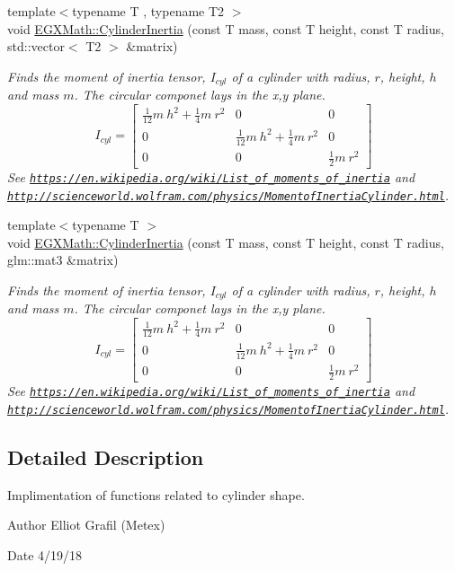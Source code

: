 \begin{DoxyCompactItemize}
{\footnotesize template$<$typename T , typename T2 $>$ }\\void \mbox{\hyperlink{group___e_g_x_math-_geometry-3_d-_cylinder_gac46dd57839cb2157d1bb6dd430d781ec}{E\+G\+X\+Math\+::\+Cylinder\+Inertia}} (const T mass, const T height, const T radius, std\+::vector$<$ T2 $>$ \&matrix)
\begin{DoxyCompactList}\small\item\em Finds the moment of inertia tensor, $I_{cyl}$ of a cylinder with radius, $r$, height, $h$ and mass $m$. The circular componet lays in the x,y plane. \[ I_{cyl}=\begin{bmatrix} \frac{1}{12}m\ h^2 + \frac{1}{4}m\ r^2 & 0 & 0\\ 0 & \frac{1}{12}m\ h^2 + \frac{1}{4}m\ r^2 & 0\\ 0 & 0 & \frac{1}{2}m\ r^2 \end{bmatrix} \] See \href{https://en.wikipedia.org/wiki/List_of_moments_of_inertia}{\tt https\+://en.\+wikipedia.\+org/wiki/\+List\+\_\+of\+\_\+moments\+\_\+of\+\_\+inertia} and \href{http://scienceworld.wolfram.com/physics/MomentofInertiaCylinder.html}{\tt http\+://scienceworld.\+wolfram.\+com/physics/\+Momentof\+Inertia\+Cylinder.\+html}. \end{DoxyCompactList}\item 
{\footnotesize template$<$typename T $>$ }\\void \mbox{\hyperlink{group___e_g_x_math-_geometry-3_d-_cylinder_ga5d9256549303e88a49b72e3d4c2c4a6d}{E\+G\+X\+Math\+::\+Cylinder\+Inertia}} (const T mass, const T height, const T radius, glm\+::mat3 \&matrix)
\begin{DoxyCompactList}\small\item\em Finds the moment of inertia tensor, $I_{cyl}$ of a cylinder with radius, $r$, height, $h$ and mass $m$. The circular componet lays in the x,y plane. \[ I_{cyl}=\begin{bmatrix} \frac{1}{12}m\ h^2 + \frac{1}{4}m\ r^2 & 0 & 0\\ 0 & \frac{1}{12}m\ h^2 + \frac{1}{4}m\ r^2 & 0\\ 0 & 0 & \frac{1}{2}m\ r^2 \end{bmatrix} \] See \href{https://en.wikipedia.org/wiki/List_of_moments_of_inertia}{\tt https\+://en.\+wikipedia.\+org/wiki/\+List\+\_\+of\+\_\+moments\+\_\+of\+\_\+inertia} and \href{http://scienceworld.wolfram.com/physics/MomentofInertiaCylinder.html}{\tt http\+://scienceworld.\+wolfram.\+com/physics/\+Momentof\+Inertia\+Cylinder.\+html}. \end{DoxyCompactList}\end{DoxyCompactItemize}


\subsection{Detailed Description}
Implimentation of functions related to cylinder shape. 

\begin{DoxyAuthor}{Author}
Elliot Grafil (Metex) 
\end{DoxyAuthor}
\begin{DoxyDate}{Date}
4/19/18 
\end{DoxyDate}
